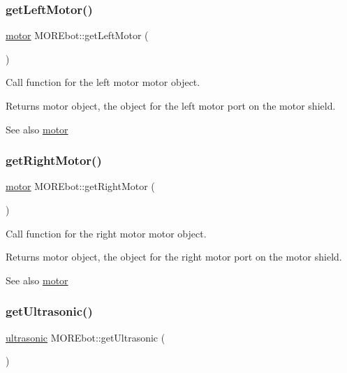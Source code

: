 \subsubsection{\texorpdfstring{getLeftMotor()}{getLeftMotor()}}
{\footnotesize\ttfamily \mbox{\hyperlink{classmotor}{motor}} M\+O\+R\+Ebot\+::get\+Left\+Motor (\begin{DoxyParamCaption}{ }\end{DoxyParamCaption})}



Call function for the left motor motor object. 

\begin{DoxyReturn}{Returns}
motor object, the object for the left motor port on the motor shield. 
\end{DoxyReturn}
\begin{DoxySeeAlso}{See also}
\mbox{\hyperlink{classmotor}{motor}} 
\end{DoxySeeAlso}
\mbox{\label{class_m_o_r_ebot_a07d97e38e8d0f40696b4d7d64078d5af}} 
\subsubsection{\texorpdfstring{getRightMotor()}{getRightMotor()}}
{\footnotesize\ttfamily \mbox{\hyperlink{classmotor}{motor}} M\+O\+R\+Ebot\+::get\+Right\+Motor (\begin{DoxyParamCaption}{ }\end{DoxyParamCaption})}



Call function for the right motor motor object. 

\begin{DoxyReturn}{Returns}
motor object, the object for the right motor port on the motor shield. 
\end{DoxyReturn}
\begin{DoxySeeAlso}{See also}
\mbox{\hyperlink{classmotor}{motor}} 
\end{DoxySeeAlso}
\mbox{\label{class_m_o_r_ebot_a30c116ce328f2ee883edf580362a6e8a}} 
\subsubsection{\texorpdfstring{getUltrasonic()}{getUltrasonic()}}
{\footnotesize\ttfamily \mbox{\hyperlink{classultrasonic}{ultrasonic}} M\+O\+R\+Ebot\+::get\+Ultrasonic (\begin{DoxyParamCaption}{ }\end{DoxyParamCaption})}



